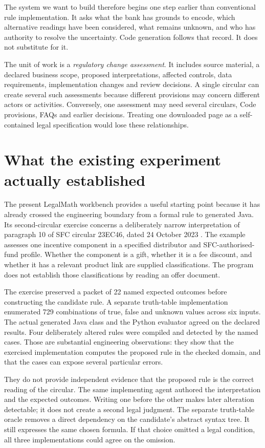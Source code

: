 The system we want to build therefore begins one step earlier than conventional
rule implementation. It asks what the bank has grounds to encode, which
alternative readings have been considered, what remains unknown, and who has
authority to resolve the uncertainty. Code generation follows that record. It
does not substitute for it.

The unit of work is a \emph{regulatory change assessment}. It includes source
material, a declared business scope, proposed interpretations, affected controls,
data requirements, implementation changes and review decisions. A single
circular can create several such assessments because different provisions may
concern different actors or activities. Conversely, one assessment may need
several circulars, Code provisions, FAQs and earlier decisions. Treating one
downloaded page as a self-contained legal specification would lose these
relationships.

\section{What the existing experiment actually established}
\label{sec:problem-evidence}
The present LegalMath workbench provides a useful starting point because it has
already crossed the engineering boundary from a formal rule to generated Java.
Its second-circular exercise concerns a deliberately narrow interpretation of
paragraph 10 of SFC circular 23EC46, dated 24 October 2023
\citep{sfcmarketing}. The example assesses one incentive component in a specified
distributor and SFC-authorised-fund profile. Whether the component is a gift,
whether it is a fee discount, and whether it has a relevant product link are
supplied classifications. The program does not establish those classifications
by reading an offer document.

The exercise preserved a packet of 22 named expected outcomes before constructing
the candidate rule. A separate truth-table implementation enumerated 729
combinations of true, false and unknown values across six inputs. The actual
generated Java class and the Python evaluator agreed on the declared results.
Four deliberately altered rules were compiled and detected by the named cases.
Those are substantial engineering observations: they show that the exercised
implementation computes the proposed rule in the checked domain, and that the
cases can expose several particular errors.

They do not provide independent evidence that the proposed rule is the correct
reading of the circular. The same implementing agent authored the interpretation
and the expected outcomes. Writing one before the other makes later alteration
detectable; it does not create a second legal judgment. The separate truth-table
oracle removes a direct dependency on the candidate's abstract syntax tree. It
still expresses the same chosen formula. If that choice omitted a legal
condition, all three implementations could agree on the omission.

